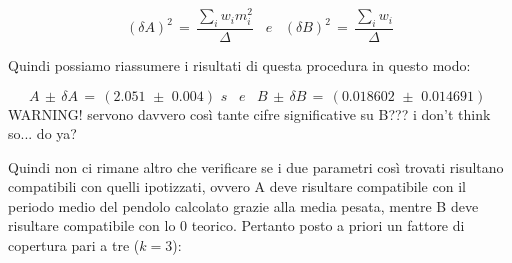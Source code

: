 \begin{itemize}
{			\begin{equation*}
				(\delta A)^2 \,=\, \frac{\sum_i w_i m_i^2}{\Delta}  \,\,\,\,\, e \,\,\,\,\,
				(\delta B)^2 \,=\, \frac{\sum_i w_i}{\Delta} 
			\end{equation*}}
	\end{itemize} 
	Quindi possiamo riassumere i risultati di questa procedura in questo modo:

	\begin{equation*}
		A \,\pm\, \delta A \,=\, (2.051 \,\, \pm \,\, 0.004) \,\,s \,\,\,\,\, e \,\,\,\,\,
		B \,\pm\, \delta B \,=\, (0.018602 \,\, \pm \,\, 0.014691) \,\,
	\end{equation*}
	WARNING! servono davvero così tante cifre significative su B??? i don't think so... do ya?

Quindi non ci rimane altro che verificare se i due parametri così trovati risultano compatibili con quelli ipotizzati, ovvero A deve risultare compatibile con il periodo medio del pendolo calcolato grazie alla media pesata, mentre B deve risultare compatibile con lo 0 teorico. Pertanto posto a priori un fattore di copertura pari a tre ($k = 3$):

